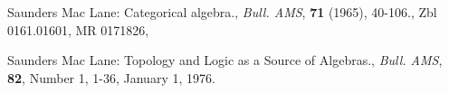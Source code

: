 \documentclass[12pt]{article}
\theoremstyle{plain}
\theoremstyle{definition}
\numberwithin{equation}{section}
\newcommand{\<}{{\langle}}
\begin{document}
\begin{thebibliography}{9}

Saunders Mac Lane: Categorical algebra., {\em Bull. AMS}, \textbf{71} (1965), 40-106., Zbl 0161.01601, MR 0171826, 

Saunders Mac Lane: Topology and Logic as a Source of Algebras., {\em Bull. AMS}, \textbf{82}, Number 1, 1-36,
January 1, 1976.


\end{thebibliography}


\end{document}
